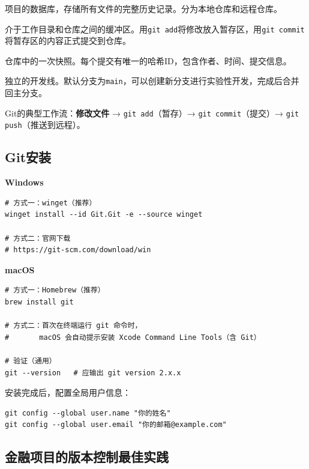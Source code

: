 \begin{theorybox}[Git的四个核心概念]
\begin{description}[leftmargin=2em]
  \item[仓库（Repository）] 项目的数据库，存储所有文件的完整历史记录。分为本地仓库和远程仓库。
  \item[暂存区（Staging Area）] 介于工作目录和仓库之间的缓冲区。用\texttt{git add}将修改放入暂存区，用\texttt{git commit}将暂存区的内容正式提交到仓库。
  \item[提交（Commit）] 仓库中的一次快照。每个提交有唯一的哈希ID，包含作者、时间、提交信息。
  \item[分支（Branch）] 独立的开发线。默认分支为\texttt{main}，可以创建新分支进行实验性开发，完成后合并回主分支。
\end{description}

Git的典型工作流：\textbf{修改文件} → \texttt{git add}（暂存）→ \texttt{git commit}（提交）→ \texttt{git push}（推送到远程）。
\end{theorybox}

\subsection{Git安装}

\textbf{Windows}

\begin{lstlisting}[style=shell]
# 方式一：winget（推荐）
winget install --id Git.Git -e --source winget

# 方式二：官网下载
# https://git-scm.com/download/win
\end{lstlisting}

\textbf{macOS}

\begin{lstlisting}[style=shell]
# 方式一：Homebrew（推荐）
brew install git

# 方式二：首次在终端运行 git 命令时，
#       macOS 会自动提示安装 Xcode Command Line Tools（含 Git）

# 验证（通用）
git --version   # 应输出 git version 2.x.x
\end{lstlisting}

安装完成后，配置全局用户信息：

\begin{lstlisting}[style=shell]
git config --global user.name "你的姓名"
git config --global user.email "你的邮箱@example.com"
\end{lstlisting}

\subsection{金融项目的版本控制最佳实践}

